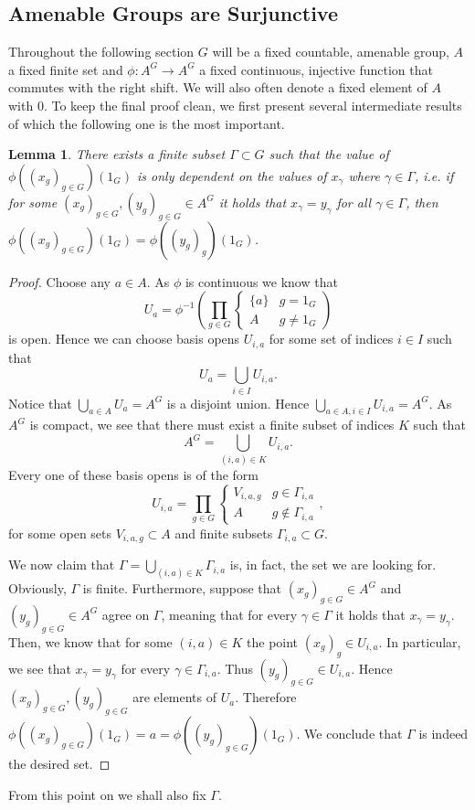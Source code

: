 \documentclass[titlepage, a4paper]{article}
\theoremstyle{theoremdd}
\newtheorem{lemma}[theorem]{Lemma}
\theoremstyle{definition}
\theoremstyle{remark}
\begin{document}
\subsection{Amenable Groups are Surjunctive} \label{ssec:amenable_surjunctive}
Throughout the following section $G$ will be a fixed countable, amenable group, $A$ a fixed finite set and $\phi: A^{G} \to A^{G}$ a fixed continuous, injective function that commutes with the right shift. 
We will also often denote a fixed element of $A$ with $0$.
To keep the final proof clean, we first present several intermediate results of which the following one is the most important.
\begin{lemma}
	There exists a finite subset $\Gamma \subset G$ such that the value of $\phi((x_g)_{g \in G})(1_G)$ is only dependent on the values of $x_\gamma$ where  $\gamma \in \Gamma$, 
	i.e. if for some  $(x_g)_{g \in G}, (y_g)_{g \in G} \in A^{G}$ it holds that $x_\gamma = y_\gamma$ for all $\gamma \in \Gamma$, then $\phi((x_g)_{g \in G})(1_G) = \phi((y_g)_g)(1_G)$.
\end{lemma}
\begin{proof}
	Choose any $a \in A$. As $\phi$ is continuous we know that \[
	U_a = \phi^{-1}\left( \prod_{g\in G} \begin{cases}
			\{a\} & g = 1_G\\
			A & g \ne 1_G
	\end{cases} \right)
\]
	is open. Hence we can choose basis opens $U_{i, a}$ for some set of indices $i \in I$ such that  \[
		U_a= \bigcup_{i \in I} U_{i,a}
	.\] 
	Notice that $\bigcup_{a \in A} U_a = A^{G}$ is a disjoint union. 
	Hence $\bigcup_{a \in A, i \in I} U_{i, a} = A^{G}$. 
	As $A^{G}$ is compact, we see that there must exist a finite subset of indices $K$ such that \[
		A^{G} = \bigcup_{(i, a) \in K} U_{i, a}
	.\] 
	Every one of these basis opens is of the form \[
	U_{i,a} = \prod_{g \in G} \begin{cases}
		V_{i,a,g} & g \in \Gamma_{i,a}\\
		A & g \not\in \Gamma_{i,a}
	\end{cases}
	,\]
	for some open sets $V_{i,a,g} \subset A$ and finite subsets $\Gamma_{i,a} \subset G$. 

	We now claim that $\Gamma = \bigcup_{(i,a) \in K} \Gamma_{i,a}$ is, in fact, the set we are looking for. 
	Obviously, $\Gamma$ is finite. 
	Furthermore, suppose that $(x_g)_{g\in G} \in A^{G}$ and $(y_g)_{g \in G} \in A^{G}$ agree on $\Gamma$,
	meaning that for every $\gamma \in \Gamma$ it holds that  $x_\gamma = y_\gamma$.
	Then, we know that for some  $(i, a) \in K$ the point $(x_g)_g \in U_{i,a}$. 
	In particular, we see that $x_\gamma = y_\gamma$ for every $\gamma \in \Gamma_{i,a}$. 
	Thus $(y_g)_{g \in G} \in U_{i, a}$. 
	Hence  $(x_g)_{g \in G} , (y_g)_{g \in G}$ are elements of $U_a$. 
	Therefore  $\phi((x_g)_{g \in G})(1_G) = a = \phi((y_g)_{g \in G})(1_G) $.
	We conclude that $\Gamma$ is indeed the desired set.
\end{proof}
From this point on we shall also fix $\Gamma$. 
\end{document}
